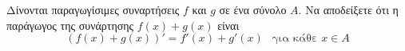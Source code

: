 Δίνονται παραγωγίσιμες συναρτήσεις $ f $ και $ g $ σε ένα σύνολο $ A $. Να αποδείξετε ότι η παράγωγος της συνάρτησης $ f(x)+g(x) $ είναι 
\[ (f(x)+g(x))'=f'(x)+g'(x)\ \ \text{ για κάθε } x\in A \]
